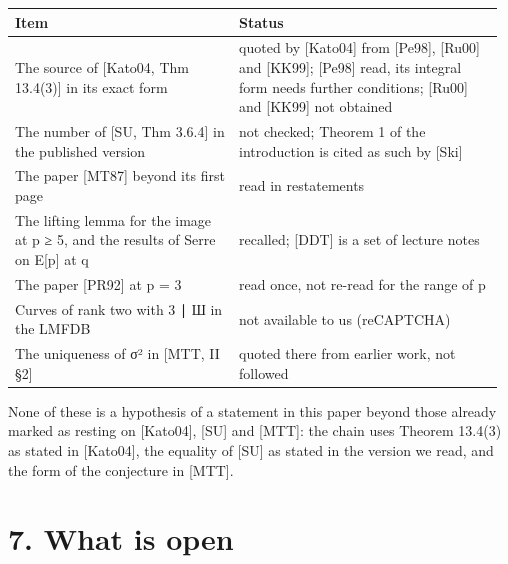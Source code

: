 \documentclass[11pt,a4paper]{article}
\theoremstyle{named}
\begin{document}
\begin{center}\begin{small}
\begin{tabular}{>{\raggedright\arraybackslash}p{0.447\linewidth}>{\raggedright\arraybackslash}p{0.525\linewidth}}
\hline
Item & Status \\
\hline
The source of [Kato04, Thm 13.4(3)] in its exact form & quoted by [Kato04] from [Pe98], [Ru00] and [KK99]; [Pe98] read, its integral form needs further conditions; [Ru00] and [KK99] not obtained \\
The number of [SU, Thm 3.6.4] in the published version & not checked; Theorem 1 of the introduction is cited as such by [Ski] \\
The paper [MT87] beyond its first page & read in restatements \\
The lifting lemma for the image at p ≥ 5, and the results of Serre on E[p] at q & recalled; [DDT] is a set of lecture notes \\
The paper [PR92] at p = 3 & read once, not re-read for the range of p \\
Curves of rank two with 3 ∣ Ш in the LMFDB & not available to us (reCAPTCHA) \\
The uniqueness of σ² in [MTT, II §2] & quoted there from earlier work, not followed \\
\hline
\end{tabular}
\end{small}\end{center}

None of these is a hypothesis of a statement in this paper beyond those already marked as resting on [Kato04], [SU] and [MTT]: the chain uses Theorem 13.4(3) as stated in [Kato04], the equality of [SU] as stated in the version we read, and the form of the conjecture in [MTT].

\section*{7. What is open}
\end{document}
